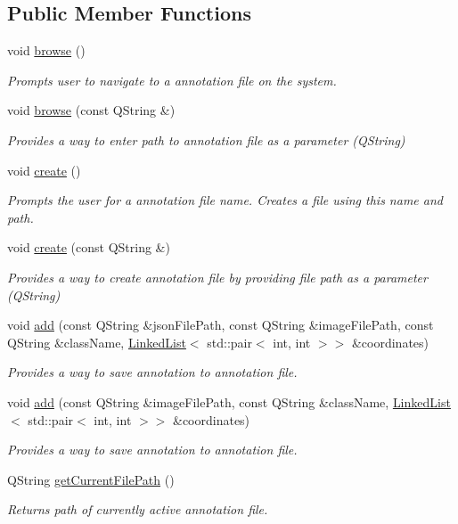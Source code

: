 \subsection*{Public Member Functions}
\begin{DoxyCompactItemize}
\item 
void \hyperlink{classAnnotationModel_aa43f69c5431ede4dc744ae9b61b49f6c}{browse} ()
\begin{DoxyCompactList}\small\item\em Prompts user to navigate to a annotation file on the system. \end{DoxyCompactList}\item 
void \hyperlink{classAnnotationModel_a54f9ffa4151a1bdcaa1d5ab3dee87679}{browse} (const Q\+String \&)
\begin{DoxyCompactList}\small\item\em Provides a way to enter path to annotation file as a parameter (Q\+String) \end{DoxyCompactList}\item 
void \hyperlink{classAnnotationModel_ac4c6850c8d0f704c3bf5bef486992690}{create} ()
\begin{DoxyCompactList}\small\item\em Prompts the user for a annotation file name. Creates a file using this name and path. \end{DoxyCompactList}\item 
void \hyperlink{classAnnotationModel_ac5062c8663670a312132929f16e4be64}{create} (const Q\+String \&)
\begin{DoxyCompactList}\small\item\em Provides a way to create annotation file by providing file path as a parameter (Q\+String) \end{DoxyCompactList}\item 
void \hyperlink{classAnnotationModel_a02d0db67913a024ee7a7dde190388bb0}{add} (const Q\+String \&json\+File\+Path, const Q\+String \&image\+File\+Path, const Q\+String \&class\+Name, \hyperlink{classLinkedList}{Linked\+List}$<$ std\+::pair$<$ int, int $>$$>$ \&coordinates)
\begin{DoxyCompactList}\small\item\em Provides a way to save annotation to annotation file. \end{DoxyCompactList}\item 
void \hyperlink{classAnnotationModel_a9bae328231474c0214dbdb367624046f}{add} (const Q\+String \&image\+File\+Path, const Q\+String \&class\+Name, \hyperlink{classLinkedList}{Linked\+List}$<$ std\+::pair$<$ int, int $>$$>$ \&coordinates)
\begin{DoxyCompactList}\small\item\em Provides a way to save annotation to annotation file. \end{DoxyCompactList}\item 
Q\+String \hyperlink{classAnnotationModel_a704170b9d4cc9e6b62e0bc22d17f6e17}{get\+Current\+File\+Path} ()
\begin{DoxyCompactList}\small\item\em Returns path of currently active annotation file. \end{DoxyCompactList}\end{DoxyCompactItemize}
